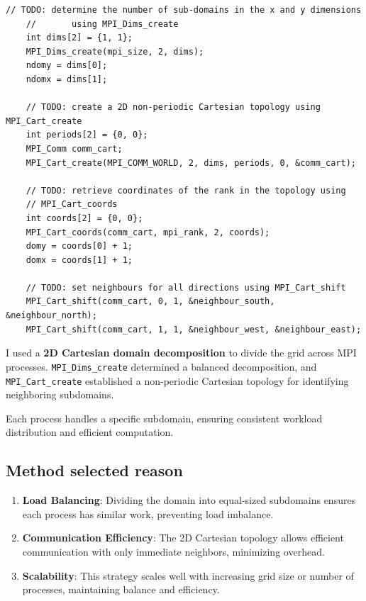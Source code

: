 \documentclass[unicode,11pt,a4paper,oneside,numbers=endperiod,openany]{scrartcl}
\begin{document}
\begin{lstlisting}[style=mystyle, language=MyC++, caption={Setting Up a 2D Cartesian Topology with MPI}]
    // TODO: determine the number of sub-domains in the x and y dimensions
    //       using MPI_Dims_create
    int dims[2] = {1, 1};
    MPI_Dims_create(mpi_size, 2, dims);
    ndomy = dims[0];
    ndomx = dims[1];

    // TODO: create a 2D non-periodic Cartesian topology using MPI_Cart_create
    int periods[2] = {0, 0};
    MPI_Comm comm_cart;
    MPI_Cart_create(MPI_COMM_WORLD, 2, dims, periods, 0, &comm_cart);

    // TODO: retrieve coordinates of the rank in the topology using
    // MPI_Cart_coords
    int coords[2] = {0, 0};
    MPI_Cart_coords(comm_cart, mpi_rank, 2, coords);
    domy = coords[0] + 1;
    domx = coords[1] + 1;

    // TODO: set neighbours for all directions using MPI_Cart_shift
    MPI_Cart_shift(comm_cart, 0, 1, &neighbour_south, &neighbour_north);
    MPI_Cart_shift(comm_cart, 1, 1, &neighbour_west, &neighbour_east);
\end{lstlisting}

I used a \textbf{2D Cartesian domain decomposition} to divide the grid across MPI processes. \texttt{MPI\_Dims\_create} determined a balanced decomposition, and \texttt{MPI\_Cart\_create} established a non-periodic Cartesian topology for identifying neighboring subdomains.

Each process handles a specific subdomain, ensuring consistent workload distribution and efficient computation.

\subsection{Method selected reason}

\begin{enumerate}
    \item \textbf{Load Balancing}: Dividing the domain into equal-sized subdomains ensures each process has similar work, preventing load imbalance.
    \item \textbf{Communication Efficiency}: The 2D Cartesian topology allows efficient communication with only immediate neighbors, minimizing overhead.
    \item \textbf{Scalability}: This strategy scales well with increasing grid size or number of processes, maintaining balance and efficiency.
\end{enumerate}
\end{document}
